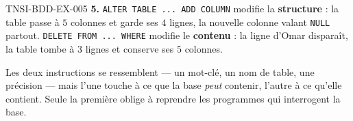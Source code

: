 \begin{corrige}{TNSI-BDD-EX-005}
\textbf{5.} \lstinline{ALTER TABLE ... ADD COLUMN} modifie la
\textbf{structure} : la table passe à $5$ colonnes et garde ses $4$ lignes, la
nouvelle colonne valant \lstinline{NULL} partout.
\lstinline{DELETE FROM ... WHERE} modifie le \textbf{contenu} : la ligne d'Omar
disparaît, la table tombe à $3$ lignes et conserve ses $5$ colonnes.

Les deux instructions se ressemblent — un mot-clé, un nom de table, une
précision — mais l'une touche à ce que la base \emph{peut} contenir, l'autre à ce
qu'elle contient. Seule la première oblige à reprendre les programmes qui
interrogent la base.
\end{corrige}

